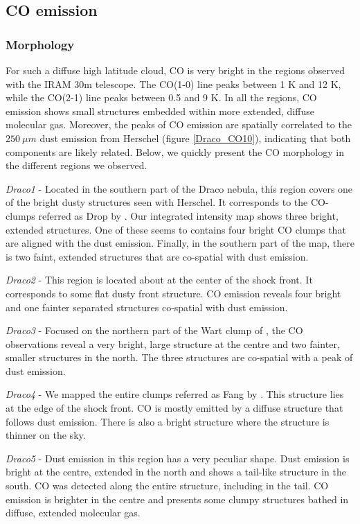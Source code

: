 \documentclass[traditabstract]{aa}
\begin{document}
\subsection{CO emission}
\subsubsection{Morphology}

For such a diffuse high latitude cloud, CO is very bright in the regions observed with the IRAM 30m telescope. The CO(1-0) line peaks between 1 K and 12 K, while the CO(2-1) line peaks between 0.5 and 9 K. In all the regions, CO emission shows small structures embedded within more extended, diffuse molecular gas. Moreover, the peaks of CO emission are spatially correlated to the $250\: \mu m$ dust emission from Herschel (figure \ref{Draco_CO10}), indicating that both components are likely related. Below, we quickly present the CO morphology in the different regions we observed.
\medskip

\noindent \textit{Draco1} - Located in the southern part of the Draco nebula, this region covers one of the bright dusty structures seen with Herschel. It corresponds to the CO-clumps referred as Drop by \cite{Mebold_1985}. Our integrated intensity map shows three bright, extended structures. One of these seems to contains four bright CO clumps that are aligned with the dust emission. Finally, in the southern part of the map, there is two faint, extended structures that are co-spatial with dust emission.
\medskip

\noindent \textit{Draco2} - This region is located about at the center of the shock front. It corresponds to some flat dusty front structure. CO emission reveals four bright and one fainter separated structures co-spatial with dust emission.
\medskip

\noindent \textit{Draco3} - Focused on the northern part of the Wart clump of \cite{Mebold_1985}, the CO observations reveal a very bright, large structure at the centre and two fainter, smaller structures in the north. The three structures are co-spatial with a peak of dust emission.
\medskip

\noindent \textit{Draco4} - We mapped the entire clumps referred as Fang by \cite{Mebold_1985}. This structure lies at the edge of the shock front. CO is mostly emitted by a diffuse structure that follows dust emission. There is also a bright structure where the structure is thinner on the sky.
\medskip

\noindent \textit{Draco5} - Dust emission in this region has a very peculiar shape. Dust emission is bright at the centre, extended in the north and shows a tail-like structure in the south. CO was detected along the entire structure, including in the tail. CO emission is brighter in the centre and presents some clumpy structures bathed in diffuse, extended molecular gas.
\medskip
\end{document}
